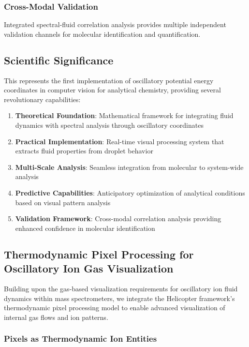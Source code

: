 \documentclass[11pt,a4paper]{article}
\theoremstyle{remark}
\begin{document}
\subsubsection{Cross-Modal Validation}

Integrated spectral-fluid correlation analysis provides multiple independent validation channels for molecular identification and quantification.

\subsection{Scientific Significance}

This represents the first implementation of oscillatory potential energy coordinates in computer vision for analytical chemistry, providing several revolutionary capabilities:

\begin{enumerate}
\item \textbf{Theoretical Foundation}: Mathematical framework for integrating fluid dynamics with spectral analysis through oscillatory coordinates
\item \textbf{Practical Implementation}: Real-time visual processing system that extracts fluid properties from droplet behavior
\item \textbf{Multi-Scale Analysis}: Seamless integration from molecular to system-wide analysis
\item \textbf{Predictive Capabilities}: Anticipatory optimization of analytical conditions based on visual pattern analysis
\item \textbf{Validation Framework}: Cross-modal correlation analysis providing enhanced confidence in molecular identification
\end{enumerate}

\subsection{Thermodynamic Pixel Processing for Oscillatory Ion Gas Visualization}

Building upon the gas-based visualization requirements for oscillatory ion fluid dynamics within mass spectrometers, we integrate the Helicopter framework's thermodynamic pixel processing model to enable advanced visualization of internal gas flows and ion patterns.

\subsubsection{Pixels as Thermodynamic Ion Entities}
\end{document}
